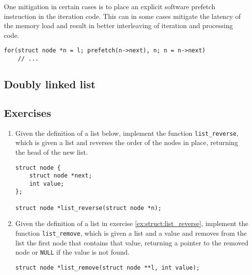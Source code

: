 One mitigation in certain cases is to place an explicit software prefetch
instruction in the iteration code.  This can in some cases mitigate the latency
of the memory load and result in better interleaving of iteration and processing
code\footnotemark.


\begin{lstlisting}
for(struct node *n = l; prefetch(n->next), n; n = n->next)
    // ...
\end{lstlisting}

\subsection{Doubly linked list}

\subsection{Exercises}

\begin{enumerate}
    \item
        \label{ex:struct:list_reverse}
        Given the definition of a list below, implement the function
        \texttt{list\_reverse}, which is given a list and reverses the order of
        the nodes in place, returning the head of the new list.
        \begin{lstlisting}[style=c]
struct node {
    struct node *next;
    int value;
};

struct node *list_reverse(struct node *n);
        \end{lstlisting}
    \item
        \label{ex:struct:list_remove}
        Given the definition of a list in exercise \ref{ex:struct:list_reverse},
        implement the function \texttt{list\_remove}, which is given a list and
        a value and removes from the list the first node that contains that
        value, returning a pointer to the removed node or \texttt{NULL} if the
        value is not found.
        \begin{lstlisting}[style=c]
struct node *list_remove(struct node **l, int value);
        \end{lstlisting}
\end{enumerate}
